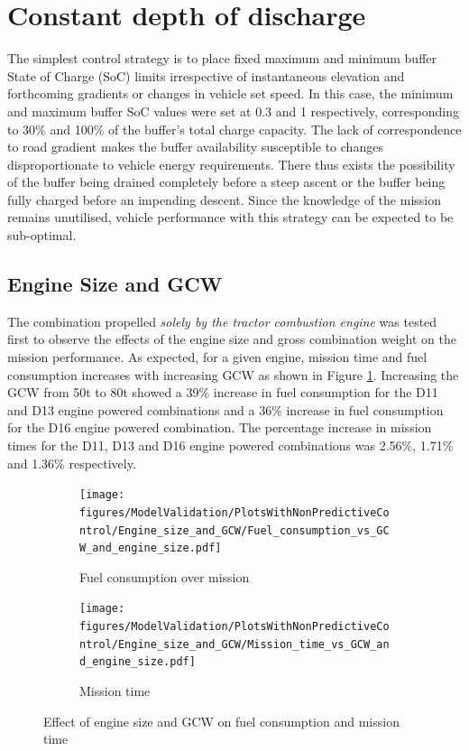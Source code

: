 \documentclass[ExampleMasters.tex]{subfiles}
\begin{document}
\section{Constant depth of discharge}
The simplest control strategy is to place fixed maximum and minimum buffer State of Charge (SoC) limits irrespective of instantaneous elevation and forthcoming gradients or changes in vehicle set speed. In this case, the minimum and maximum buffer SoC values were set at 0.3 and 1 respectively, corresponding to 30\% and 100\% of the buffer's total charge capacity. The lack of correspondence to road gradient makes the buffer availability susceptible to changes disproportionate to vehicle energy requirements. There thus exists the possibility of the buffer being drained completely before a steep ascent or the buffer being fully charged before an impending descent. Since the knowledge of the mission remains unutilised, vehicle performance with this strategy can be expected to be sub-optimal.

\subsection{Engine Size and GCW}
The combination propelled \textit{solely by the tractor combustion engine} was tested first to observe the effects of the engine size and gross combination weight on the mission performance. As expected, for a given engine, mission time and fuel consumption increases with increasing GCW as shown in Figure \ref{timeFuelGCWEngine}. Increasing the GCW from 50t to 80t showed a 39\% increase in fuel consumption for the D11 and D13 engine powered combinations and a 36\% increase in fuel consumption for the D16 engine powered combination. The percentage increase in mission times for the D11, D13 and D16 engine powered combinations was 2.56\%, 1.71\% and 1.36\% respectively.\\

\begin{figure}[h!]
\begin{subfigure}{.5\textwidth}
	\centering
	\texttt{[image: figures/ModelValidation/PlotsWithNonPredictiveControl/Engine\_size\_and\_GCW/Fuel\_consumption\_vs\_GCW\_and\_engine\_size.pdf]}
	\caption{Fuel consumption over mission}
\end{subfigure}
\begin{subfigure}{.5\textwidth}
	\centering
	\texttt{[image: figures/ModelValidation/PlotsWithNonPredictiveControl/Engine\_size\_and\_GCW/Mission\_time\_vs\_GCW\_and\_engine\_size.pdf]}
	\caption{Mission time}
\end{subfigure}
\caption{Effect of engine size and GCW on fuel consumption and mission time}
\label{timeFuelGCWEngine}
\end{figure}
\end{document}

